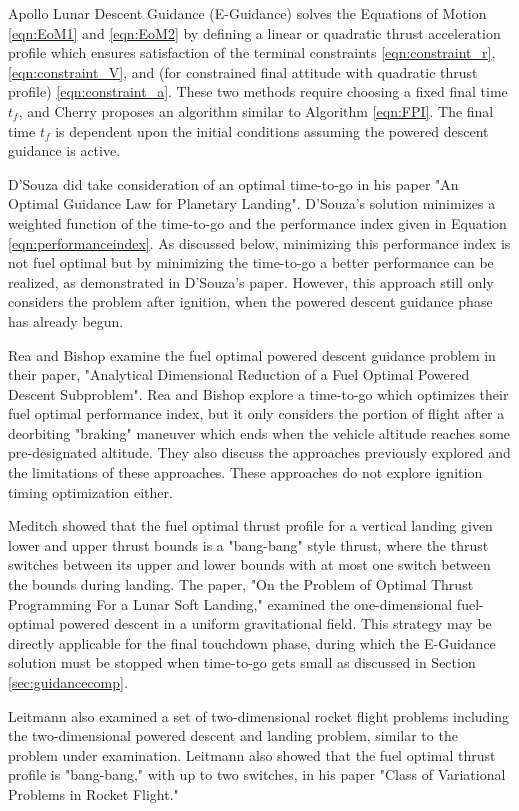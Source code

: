 Apollo Lunar Descent Guidance (E-Guidance) solves the Equations of Motion \ref{eqn:EoM1} and \ref{eqn:EoM2} by defining a linear or quadratic thrust acceleration profile which ensures satisfaction of the terminal constraints \ref{eqn:constraint_r}, \ref{eqn:constraint_V}, and (for constrained final attitude with quadratic thrust profile) \ref{eqn:constraint_a}. These two methods require choosing a fixed final time $t_f$, and Cherry proposes an algorithm similar to Algorithm \ref{eqn:FPI}. The final time $t_f$ is dependent upon the initial conditions assuming the powered descent guidance is active.

D'Souza did take consideration of an optimal time-to-go in his paper "An Optimal Guidance Law for Planetary Landing"\:\cite{DSOUZA}. D'Souza's solution minimizes a weighted function of the time-to-go and the performance index given in Equation \ref{eqn:performanceindex}. As discussed below, minimizing this performance index is not fuel optimal but by minimizing the time-to-go a better performance can be realized, as demonstrated in D'Souza's paper. However, this approach still only considers the problem after ignition, when the powered descent guidance phase has already begun.

Rea and Bishop examine the fuel optimal powered descent guidance problem in their paper, "Analytical Dimensional Reduction of a Fuel Optimal Powered Descent Subproblem"\:\cite{REA}. Rea and Bishop explore a time-to-go which optimizes their fuel optimal performance index, but it only considers the portion of flight after a deorbiting "braking" maneuver which ends when the vehicle altitude reaches some pre-designated altitude. They also discuss the approaches previously explored and the limitations of these approaches. These approaches do not explore ignition timing optimization either.

Meditch showed that the fuel optimal thrust profile for a vertical landing given lower and upper thrust bounds is a "bang-bang" style thrust, where the thrust switches between its upper and lower bounds with at most one switch between the bounds during landing. The paper, "On the Problem of Optimal Thrust Programming For a Lunar Soft Landing,"\:\cite{MEDITCH} examined the one-dimensional fuel-optimal powered descent in a uniform gravitational field. This strategy may be directly applicable for the final touchdown phase, during which the E-Guidance solution must be stopped when time-to-go gets small as discussed in Section \ref{sec:guidancecomp}.

Leitmann also examined a set of two-dimensional rocket flight problems including the two-dimensional powered descent and landing problem, similar to the problem under examination. Leitmann also showed that the fuel optimal thrust profile is "bang-bang," with up to two switches, in his paper "Class of Variational Problems in Rocket Flight."\:\cite{LEITMANN} 


